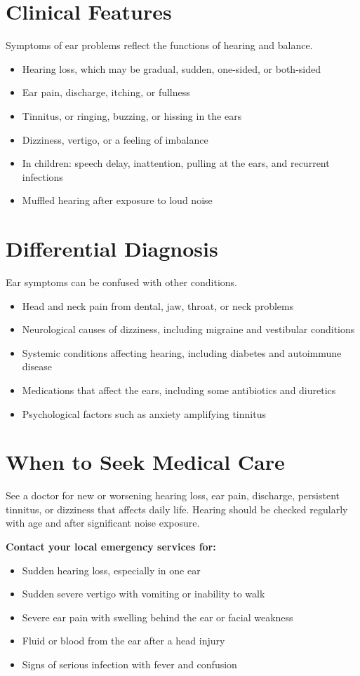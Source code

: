 \section*{Clinical Features}
Symptoms of ear problems reflect the functions of hearing and balance.
\begin{itemize}
    \item Hearing loss, which may be gradual, sudden, one-sided, or both-sided
    \item Ear pain, discharge, itching, or fullness
    \item Tinnitus, or ringing, buzzing, or hissing in the ears
    \item Dizziness, vertigo, or a feeling of imbalance
    \item In children: speech delay, inattention, pulling at the ears, and recurrent infections
    \item Muffled hearing after exposure to loud noise
\end{itemize}

\section*{Differential Diagnosis}
Ear symptoms can be confused with other conditions.
\begin{itemize}
    \item Head and neck pain from dental, jaw, throat, or neck problems
    \item Neurological causes of dizziness, including migraine and vestibular conditions
    \item Systemic conditions affecting hearing, including diabetes and autoimmune disease
    \item Medications that affect the ears, including some antibiotics and diuretics
    \item Psychological factors such as anxiety amplifying tinnitus
\end{itemize}

\section*{When to Seek Medical Care}
See a doctor for new or worsening hearing loss, ear pain, discharge, persistent tinnitus, or dizziness that affects daily life. Hearing should be checked regularly with age and after significant noise exposure.

\textbf{Contact your local emergency services for:}
\begin{itemize}
    \item Sudden hearing loss, especially in one ear
    \item Sudden severe vertigo with vomiting or inability to walk
    \item Severe ear pain with swelling behind the ear or facial weakness
    \item Fluid or blood from the ear after a head injury
    \item Signs of serious infection with fever and confusion
\end{itemize}

